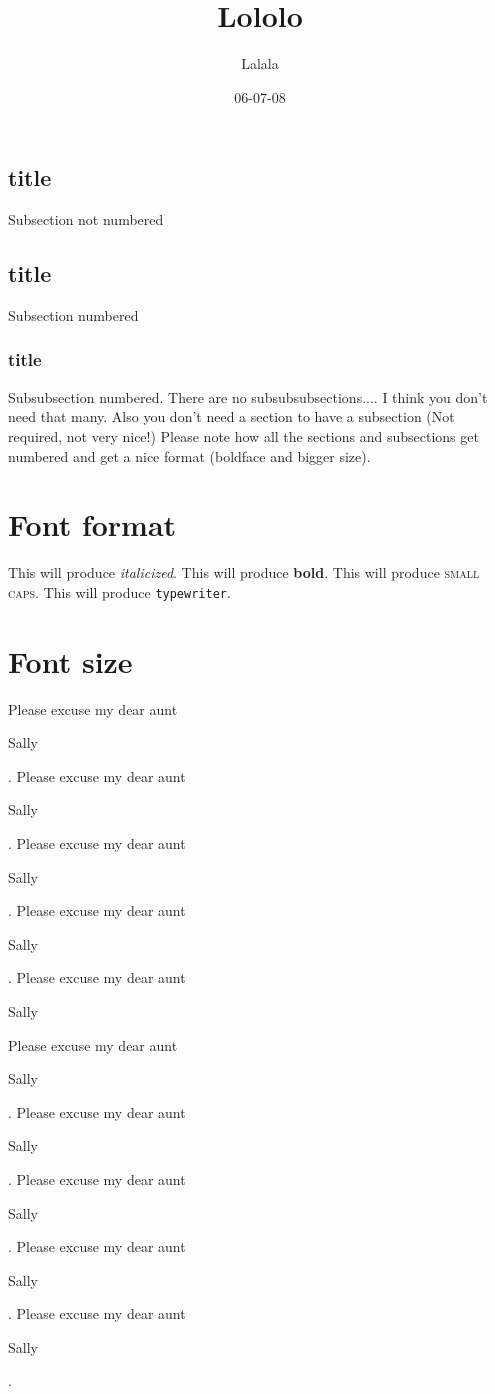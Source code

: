 \documentclass[]{article}
\title{Lololo}
\author{Lalala}
\date{06-07-08}
\begin{document}
	\maketitle
	\subsection*{title}
	Subsection not numbered
	\subsection{title}
	Subsection numbered
	\subsubsection[short title]{title}
	Subsubsection numbered.
	There are no subsubsubsections.... I think you don't need that many. Also you don't need a section to have a subsection (Not required, not very nice!)
	Please note how all the sections and subsections get numbered and get a nice format (boldface and bigger size).
	\section{Font format} 
	This will produce \textit{italicized}.
	This will produce \textbf{bold}.
	This will produce \textsc{small caps}.
	This will produce \texttt{typewriter}.
	\section{Font size}
	Please excuse my dear aunt \begin{Huge}Sally\end{Huge}.
	Please excuse my dear aunt \begin{huge}Sally\end{huge}.
	Please excuse my dear aunt \begin{LARGE}Sally\end{LARGE}.
	Please excuse my dear aunt \begin{Large}Sally\end{Large}.
	Please excuse my dear aunt \begin{large}Sally\end{large}
	Please excuse my dear aunt \begin{normalsize}Sally\end{normalsize}.
	Please excuse my dear aunt \begin{small}Sally\end{small}.
	Please excuse my dear aunt \begin{footnotesize}Sally\end{footnotesize}.
	Please excuse my dear aunt \begin{scriptsize}Sally\end{scriptsize}.
	Please excuse my dear aunt \begin{tiny}Sally\end{tiny}.
\end{document}
